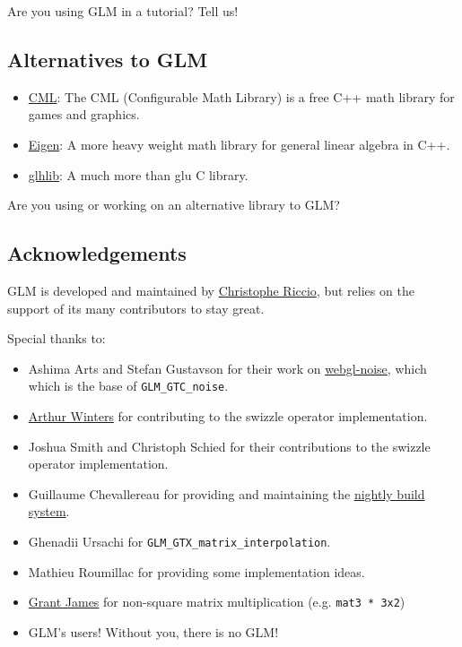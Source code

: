 \documentclass{scrartcl}
\numberwithin{figure}{subsection}
\begin{document}
Are you using GLM in a tutorial?  Tell us!


\subsection{Alternatives to GLM}

\begin{itemize}
  \item \href{http://cmldev.net/}{CML}: The CML (Configurable Math Library) is a free C++ math library for games and graphics.
  \item \href{http://eigen.tuxfamily.org/}{Eigen}: A more heavy weight math library for general linear algebra in C++.
  \item \href{http://glhlib.sourceforge.net/}{glhlib}: A much more than glu C library.
\end{itemize}

Are you using or working on an alternative library to GLM?

\subsection{Acknowledgements}

GLM is developed and maintained by \href{http://www.g-truc.net}{Christophe Riccio}, but relies on the support of its many contributors to stay great.

Special thanks to:

\fi
\begin{itemize}
  \item Ashima Arts and Stefan Gustavson for their work on \href{https://github.com/ashima/webgl-noise}{webgl-noise}, which which is the base of \verb|GLM_GTC_noise|.
  \item \href{http://athile.net/library/wiki/index.php?title=Athile_Technologies}{Arthur Winters} for contributing to the swizzle operator implementation.
  \item Joshua Smith and Christoph Schied for their contributions to the swizzle operator implementation.
  \item Guillaume Chevallereau for providing and maintaining the \href{http://my.cdash.org/index.php?project=GLM}{nightly build system}.
  \item Ghenadii Ursachi for \verb|GLM_GTX_matrix_interpolation|.
  \item Mathieu Roumillac for providing some implementation ideas.
  \item \href{http://www.zeuscmd.com/}{Grant James} for non-square matrix multiplication (e.g. \verb|mat3 * 3x2|)
  \item GLM's users!  Without you, there is no GLM!
\end{itemize}
\end{document}
